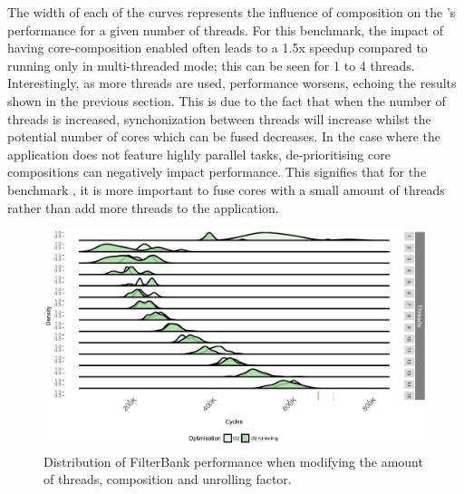The width of each of the curves represents the influence of composition on the 's performance for a given number of threads.
For this benchmark, the impact of having core-composition enabled often leads to a 1.5x speedup compared to running only in multi-threaded mode; this can be seen for 1 to 4 threads.
Interestingly, as more threads are used, performance worsens, echoing the results shown in the previous section.
This is due to the fact that when the number of threads is increased, synchonization between threads will increase whilst the potential number of cores which can be fused decreases.
In the case where the application does not feature highly parallel tasks, de-prioritising core compositions can negatively impact performance.
This signifies that for the benchmark , it is more important to fuse cores with a small amount of threads rather than add more threads to the application.


\begin{figure}[t]
  \includegraphics[width=1\textwidth]{streamit-paper/graphics/filterbank_unroll.pdf}
  \caption{Distribution of FilterBank performance when modifying the amount of threads, composition and unrolling factor.}\label{fig:fbunroll}
\end{figure}


